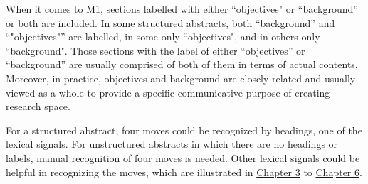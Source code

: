 \documentclass[a4paper]{ctexbook}
\begin{document}
When it comes to M1, sections labelled with either ``objectives" or ``background'' or both are included. In some structured abstracts, both ``background'' and ``"objectives"'' are labelled, in some only ``objectives", and in others only ``background". Those sections with the label of either ``objectives'' or ``background'' are usually comprised of both of them in terms of actual contents. Moreover, in practice, objectives and background are closely related and usually viewed as a whole to provide a specific communicative purpose of creating research space.

For a structured abstract, four moves could be recognized by headings, one of the lexical signals. For unstructured abstracts in which there are no headings or labels, manual recognition of four moves is needed. Other lexical signals could be helpful in recognizing the moves, which are illustrated in \hyperref[chapter3]{Chapter 3} to \hyperref[chapter6]{Chapter 6}.
\end{document}
